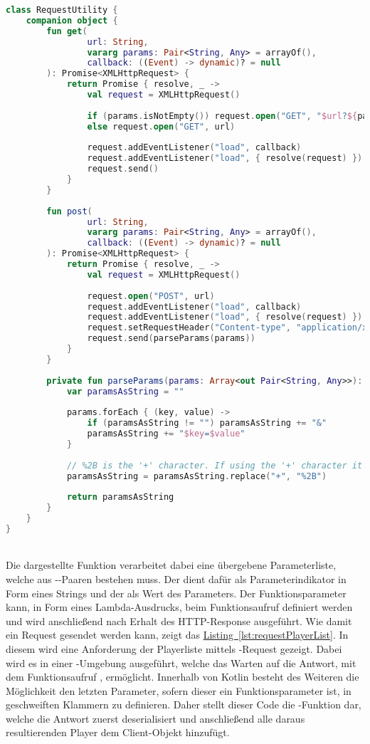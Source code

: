\begin{lstlisting}[style=lstStyleFramed, language=Kotlin, caption={Implementierung der Request-Methoden \code{GET} und \code{POST}, inklusive der Parameterverarbeitung}, label=lst:requestUtility, float]
class RequestUtility {
	companion object {
		fun get(
				url: String, 
				vararg params: Pair<String, Any> = arrayOf(), 
				callback: ((Event) -> dynamic)? = null
		): Promise<XMLHttpRequest> {
			return Promise { resolve, _ ->
				val request = XMLHttpRequest()
				
				if (params.isNotEmpty()) request.open("GET", "$url?${parseParams(params)}")
				else request.open("GET", url)
				
				request.addEventListener("load", callback)
				request.addEventListener("load", { resolve(request) })
				request.send()
			}
		}
	
		fun post(
				url: String, 
				vararg params: Pair<String, Any> = arrayOf(), 
				callback: ((Event) -> dynamic)? = null
		): Promise<XMLHttpRequest> {
			return Promise { resolve, _ ->
				val request = XMLHttpRequest()
				
				request.open("POST", url)
				request.addEventListener("load", callback)
				request.addEventListener("load", { resolve(request) })
				request.setRequestHeader("Content-type", "application/x-www-form-urlencoded")
				request.send(parseParams(params))
			}
		}
	
		private fun parseParams(params: Array<out Pair<String, Any>>): String {
			var paramsAsString = ""
			
			params.forEach { (key, value) ->
				if (paramsAsString != "") paramsAsString += "&"
				paramsAsString += "$key=$value"
			}
			
			// %2B is the '+' character. If using the '+' character it will parse into a space character
			paramsAsString = paramsAsString.replace("+", "%2B")
			
			return paramsAsString
		}
	}
}
\end{lstlisting}
\\
Die dargestellte Funktion  verarbeitet dabei eine übergebene Parameterliste, welche aus --Paaren bestehen muss. Der  dient dafür als Parameterindikator in Form eines Strings und der  als Wert des Parameters. Der Funktionsparameter  kann, in Form eines Lambda-Ausdrucks, beim Funktionsaufruf definiert werden und wird anschließend nach Erhalt des \gls{HTTP}-Response ausgeführt.
\newpage\noindent
Wie damit ein Request gesendet werden kann, zeigt das \hyperref[lst:requestPlayerList]{Listing~\ref{lst:requestPlayerList}}. In diesem wird eine Anforderung der Playerliste mittels -Request gezeigt. Dabei wird es in einer -Umgebung ausgeführt, welche das Warten auf die Antwort, mit dem Funktionsaufruf , ermöglicht. Innerhalb von Kotlin besteht des Weiteren die Möglichkeit den letzten Parameter, sofern dieser ein Funktionsparameter ist, in geschweiften Klammern zu definieren. Daher stellt dieser Code die -Funktion dar, welche die Antwort zuerst deserialisiert und anschließend alle daraus resultierenden Player dem Client-Objekt hinzufügt.\\
